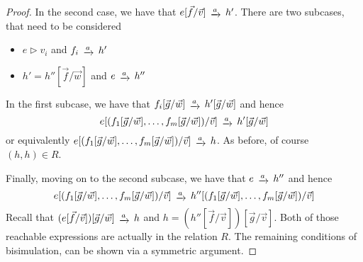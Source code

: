 \begin{proof}
	In the second case, we have that $e[\vec{f}/\vec{v}] \tr{a} h'$. There are two subcases, that need to be considered
	\begin{itemize}
		\item $e \rhd v_i$ and $f_i \tr{a} h'$
		\item $h' = h''[\vec{f}/ \vec{w}]$ and $e \tr{a} h''$ 
	\end{itemize}
	In the first subcase, we have that $f_i[\vec{g}/ \vec{w}] \tr{a} h'[\vec{g}/\vec{w}]$ and hence $$e[(f_1[\vec{g}/ \vec{w}], \dots, f_m[\vec{g}/ \vec{w}])/\vec{v}] \tr{a} h'[\vec{g}/\vec{w}]$$ or equivalently $e[(f_1[\vec{g}/ \vec{w}], \dots, f_m[\vec{g}/ \vec{w}])/\vec{v}] \tr{a} h$. As before, of course $(h,h) \in R$. 
	
	Finally, moving on to the second subcase, we have that $e \tr{a} h''$ and hence $$e[(f_1[\vec{g}/ \vec{w}], \dots, f_m[\vec{g}/ \vec{w}])/\vec{v}] \tr{a} h''[(f_1[\vec{g}/ \vec{w}], \dots, f_m[\vec{g}/ \vec{w}])/\vec{v}]$$ Recall that $(e[\vec{f}/ \vec{v}])[\vec{g}/\vec{w}] \tr{a} h$ and $h = (h''[\vec{f}/\vec{v}])[\vec{g}/\vec{v}]$. Both of those reachable expressions are actually in the relation $R$. The remaining conditions of bisimulation, can be shown via a symmetric argument. 
\end{proof}

